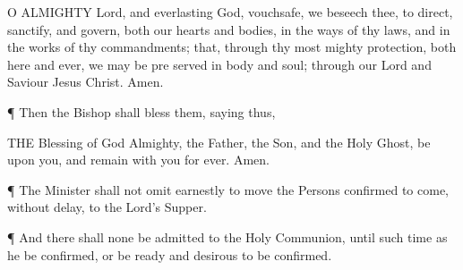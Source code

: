 O ALMIGHTY Lord, and everlasting God, vouchsafe, we beseech thee, to direct, sanctify, and govern, both our hearts and bodies, in the ways of thy laws, and in the works of thy commandments; that, through thy most mighty protection, both here and ever, we may be pre served in body and soul; through our Lord and Saviour Jesus Christ. Amen.

¶ Then the Bishop shall bless them, saying thus,

THE Blessing of God Almighty, the Father, the Son, and the Holy Ghost, be upon you, and remain with you for ever. Amen.

¶ The Minister shall not omit earnestly to move the Persons confirmed to come, without delay, to the Lord’s Supper.

¶ And there shall none be admitted to the Holy Communion, until such time as he be confirmed, or be ready and desirous to be confirmed.